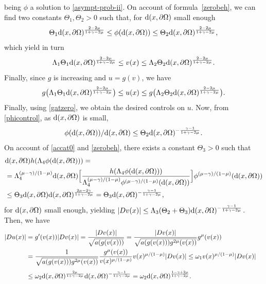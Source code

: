 \documentclass[10pt]{amsart}
\numberwithin{equation}{section}
\theoremstyle{definition}
\begin{document}
being $\phi$ a solution to \eqref{asympt-prob-ii}. On account of formula~\eqref{zerobeh}, we can find two constants $\Theta_1,\Theta_2>0$
such that, for ${\rm d}(x,\partial\Omega)$ small enough
\begin{equation}
	\label{phicontrol}
\Theta_1 {\rm d}(x,\partial\Omega)^{{\frac{2-2\mu}{1+\gamma-2\mu}}}\leq \phi({\rm d}(x,\partial\Omega))\leq
\Theta_2 {\rm d}(x,\partial\Omega)^{{\frac{2-2\mu}{1+\gamma-2\mu}}},
\end{equation}
which yield in turn
$$
\Lambda_1\Theta_1 {\rm d}(x,\partial\Omega)^{{\frac{2-2\mu}{1+\gamma-2\mu}}}\leq 
v(x)\leq \Lambda_2\Theta_2 {\rm d}(x,\partial\Omega)^{{\frac{2-2\mu}{1+\gamma-2\mu}}}.
$$
Finally, since $g$ is increasing and $u=g(v)$, we have
$$
g\big(\Lambda_1\Theta_1 {\rm d}(x,\partial\Omega)^{{\frac{2-2\mu}{1+\gamma-2\mu}}}\big)\leq 
u(x)\leq g\big(\Lambda_2\Theta_2 {\rm d}(x,\partial\Omega)^{{\frac{2-2\mu}{1+\gamma-2\mu}}}\big).
$$
Finally, using \eqref{gatzero}, we obtain the desired controls on $u$.
Now, from \eqref{phicontrol}, as ${\rm d}(x,\partial\Omega)$ is small,
$$
\phi({\rm d}(x,\partial\Omega))/{\rm d}(x,\partial\Omega)\leq \Theta_2 {\rm d}(x,\partial\Omega)^{-{\frac{\gamma-1}{1+\gamma-2\mu}}}.
$$
On account of \eqref{accat0} and \eqref{zerobeh}, there exists a constant $\Theta_3>0$ such that 
\begin{align*}
& {\rm d}(x,\partial\Omega)h(\Lambda_4\phi({\rm d}(x,\partial\Omega))) =\\
& =\Lambda_4^{(\mu-\gamma)/(1-\mu)}{\rm d}(x,\partial\Omega)
\Big[\frac{h(\Lambda_4\phi({\rm d}(x,\partial\Omega)))}{\Lambda_4^{(\mu-\gamma)/(1-\mu)}
\phi^{(\mu-\gamma)/(1-\mu)}({\rm d}(x,\partial\Omega))}\Big]\phi^{(\mu-\gamma)/(1-\mu)}({\rm d}(x,\partial\Omega)) \\
& \leq \Theta_3{\rm d}(x,\partial\Omega){\rm d}(x,\partial\Omega)^{{\frac{2\mu-2\gamma}{1+\gamma-2\mu}}}=
\Theta_3 {\rm d}(x,\partial\Omega)^{-{\frac{\gamma-1}{1+\gamma-2\mu}}},
\end{align*}
for ${\rm d}(x,\partial\Omega)$ small enough, yielding 
$|Dv(x)|\leq \Lambda_3 (\Theta_2+\Theta_3){\rm d}(x,\partial\Omega)^{-{\frac{\gamma-1}{1+\gamma-2\mu}}}$.
Then, we have
\begin{align*}
|Du(x)| &=g'(v(x))|Dv(x)|=\frac{|Dv(x)|}{\sqrt{a(g(v(x)))}}=\frac{|Dv(x)|}{\sqrt{a(g(v(x)))g^{2\mu}(v(x))}}g^{\mu}(v(x)) &\\
& =\frac{1}{\sqrt{a(g(v(x)))g^{2\mu}(v(x))}}\frac{g^{\mu}(v(x))}{v(x)^{\mu/(1-\mu)}}v(x)^{\mu/(1-\mu)}|Dv(x)|
\leq\omega_1 v(x)^{\mu/(1-\mu)}|Dv(x)| \\
\noalign{\vskip4pt}
&\leq \omega_2{\rm d}(x,\partial\Omega)^{{\frac{2\mu}{1+\gamma-2\mu}}}{\rm d}(x,\partial\Omega)^{-{\frac{\gamma-1}{1+\gamma-2\mu}}}
=\omega_2{\rm d}(x,\partial\Omega)^{{\frac{1-\gamma+2\mu}{1+\gamma-2\mu}}}.
\end{align*}
\end{document}
